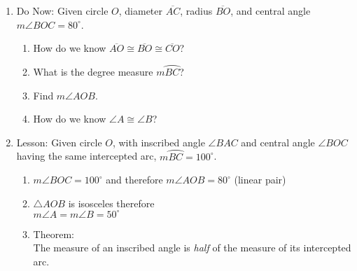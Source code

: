 \documentclass[12pt, twoside]{article}
\begin{document}
\begin{enumerate}
\newpage
\item Do Now: Given circle $O$, diameter $\overline {AC}$, radius $\overline {BO}$, and central angle $m\angle BOC= 80^\circ$.
    \begin{multicols}{2}
    \raggedcolumns
    \begin{enumerate}[itemsep=1cm]
      \item How do we know $\overline {AO} \cong \overline {BO} \cong \overline {CO}$?
      \item What is the degree measure $m \wideparen{BC}$?
      \item Find $m\angle AOB$.
      \item How do we know $\angle A \cong \angle B$?
    \end{enumerate}
    \end{multicols}
  
\newpage
\item Lesson: Given circle $O$, with inscribed angle $\angle BAC$ and central angle $\angle BOC$ having the same intercepted arc, $m \wideparen{BC}= 100^\circ$.
    \begin{multicols}{2}
    \raggedcolumns
    \begin{enumerate}[itemsep=1cm]
      \item $m\angle BOC = 100^\circ$ and therefore $m\angle AOB = 80^\circ$ (linear pair)
      \item $\triangle AOB$ is isosceles therefore\\ $m \angle A = m \angle B = 50^\circ$
      \item Theorem: \\The measure of an inscribed angle is \emph{half} of the measure of its intercepted arc.
    \end{enumerate}
    \end{multicols}


\end{enumerate}
\end{document}
